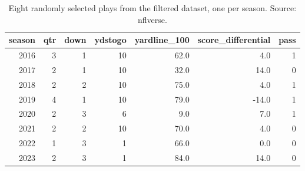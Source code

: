 \begin{table}[htbp]
\caption{Eight randomly selected plays from the filtered dataset, one per season. Source: nflverse.}
\label{tab:data-preview}
\small
\begin{tabular}{rrrrrrr}
\toprule
season & qtr & down & ydstogo & yardline\_100 & score\_differential & pass \\
\midrule
2016 & 3 & 1 & 10 & 62.0 & 4.0 & 1 \\
2017 & 2 & 1 & 10 & 32.0 & 14.0 & 0 \\
2018 & 2 & 2 & 10 & 75.0 & 4.0 & 1 \\
2019 & 4 & 1 & 10 & 79.0 & -14.0 & 1 \\
2020 & 2 & 3 & 6 & 9.0 & 7.0 & 1 \\
2021 & 2 & 2 & 10 & 70.0 & 4.0 & 0 \\
2022 & 1 & 3 & 1 & 66.0 & 0.0 & 0 \\
2023 & 2 & 3 & 1 & 84.0 & 14.0 & 0 \\
\bottomrule
\end{tabular}
\end{table}
